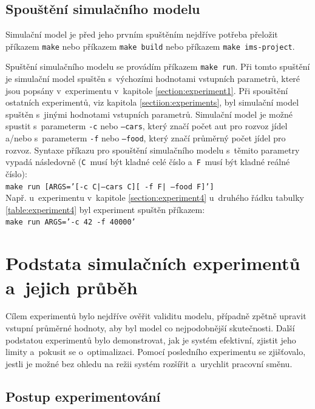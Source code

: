 \documentclass[a4paper, 11pt]{article}
\begin{document}
	\subsection{Spouštění simulačního modelu}
	\label{section:run_simulation_model}

	Simulační model je před jeho prvním spuštěním nejdříve potřeba přeložit
	příkazem \texttt{make} nebo příkazem \texttt{make build} nebo příkazem
	\texttt{make ims-project}.

	Spuštění simulačního modelu se provádím příkazem \texttt{make run}. Při
	tomto spuštění je simulační model spuštěn s~výchozími hodnotami vstupních
	parametrů, které jsou popsány v~experimentu v~kapitole
	\ref{section:experiment1}. Při spouštění ostatních experimentů, viz
	kapitola \ref{sectiion:experiments}, byl simulační model spuštěn
	s~jinými hodnotami vstupních parametrů. Simulační model je možné
	spustit s~parameterm \texttt{-c} nebo \texttt{--cars}, který značí
	počet aut pro rozvoz jídel a/nebo s~parameterm \texttt{-f} nebo
	\texttt{--food}, který značí průměrný počet jídel pro rozvoz. Syntaxe
	příkazu pro spouštění simulačního modelu s~těmito parametry vypadá
	následovně (\texttt{C}~musí být kladné celé číslo a~\texttt{F}~musí
	být kladné reálné číslo): \\
	\texttt{make run [ARGS='[-c C|--cars C][ -f F| --food F]']} \\
	Např. u~experimentu v~kapitole \ref{section:experiment4} u~druhého
	řádku tabulky \ref{table:experiment4} byl experiment spuštěn příkazem: \\
	\texttt{make run ARGS='-c 42 -f 40000'}



	\section{Podstata simulačních experimentů a~jejich průběh}

	Cílem experimentů bylo nejdříve ověřit validitu modelu, případně zpětně
	upravit vstupní průměrné hodnoty, aby byl model co nejpodobnější
	skutečnosti. Další podstatou experimentů bylo demonstrovat, jak je
	systém efektivní, zjistit jeho limity a~pokusit se o~optimalizaci.
	Pomocí posledního experimentu se zjišťovalo, jestli je možné bez ohledu
	na režii systém rozšířit a~urychlit pracovní směnu.


	\subsection{Postup experimentování}
\end{document}
